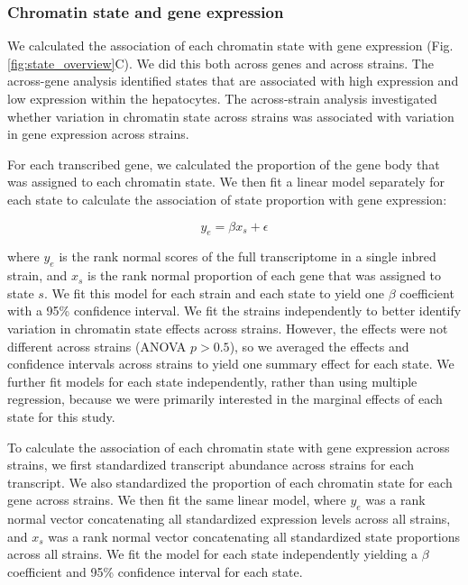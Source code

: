 \documentclass[
  11pt,
]{article}
\begin{document}
\hypertarget{chromatin-state-and-gene-expression}{%
\subsubsection{Chromatin state and gene
expression}\label{chromatin-state-and-gene-expression}}

We calculated the association of each chromatin state with gene
expression (Fig. \ref{fig:state_overview}C). We did this both across
genes and across strains. The across-gene analysis identified states
that are associated with high expression and low expression within the
hepatocytes. The across-strain analysis investigated whether variation
in chromatin state across strains was associated with variation in gene
expression across strains.

For each transcribed gene, we calculated the proportion of the gene body
that was assigned to each chromatin state. We then fit a linear model
separately for each state to calculate the association of state
proportion with gene expression:

\begin{equation}\label{eqn:model}
y_{e} = \beta x_{s} + \epsilon
\end{equation}

where \(y_{e}\) is the rank normal scores \citep{conover1999practical}
of the full transcriptome in a single inbred strain, and \(x_{s}\) is
the rank normal proportion of each gene that was assigned to state
\(s\). We fit this model for each strain and each state to yield one
\(\beta\) coefficient with a 95\% confidence interval. We fit the
strains independently to better identify variation in chromatin state
effects across strains. However, the effects were not different across
strains (ANOVA \(p > 0.5\)), so we averaged the effects and confidence
intervals across strains to yield one summary effect for each state. We
further fit models for each state independently, rather than using
multiple regression, because we were primarily interested in the
marginal effects of each state for this study.

To calculate the association of each chromatin state with gene
expression across strains, we first standardized transcript abundance
across strains for each transcript. We also standardized the proportion
of each chromatin state for each gene across strains. We then fit the
same linear model, where \(y_{e}\) was a rank normal vector
concatenating all standardized expression levels across all strains, and
\(x_{s}\) was a rank normal vector concatenating all standardized state
proportions across all strains. We fit the model for each state
independently yielding a \(\beta\) coefficient and 95\% confidence
interval for each state.
\end{document}
